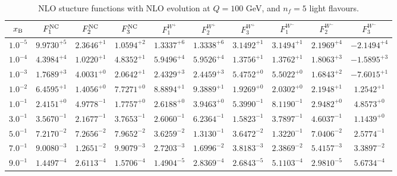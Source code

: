 \begin{table}[h]
\begin{adjustbox}{width=\textwidth}
\begin{tabular}{|c||c|c|c|c|c|c|c|c|c|}
\hline
$x_{\rm B}$ & $F_1^{\rm NC}$ & $F_2^{\rm NC}$ & $F_3^{\rm NC}$ & $F_1^{W^+}$ & $F_2^{W^+}$ & $F_3^{W^+}$ & $F_1^{W^-}$ & $F_2^{W^-}$ & $F_3^{W^-}$ \\
\hline
$ 1.0^{-5}$ & $ 9.9730^{+5}$ & $ 2.3646^{+1}$ & $ 1.0594^{+2}$ & $ 1.3337^{+6}$ & $ 1.3338^{+6}$ & $ 3.1492^{+1}$ & $ 3.1494^{+1}$ & $ 2.1969^{+4}$ & $-2.1494^{+4}$ \\
$ 1.0^{-4}$ & $ 4.3984^{+4}$ & $ 1.0220^{+1}$ & $ 4.8352^{+1}$ & $ 5.9496^{+4}$ & $ 5.9526^{+4}$ & $ 1.3756^{+1}$ & $ 1.3762^{+1}$ & $ 1.8063^{+3}$ & $-1.5895^{+3}$ \\
$ 1.0^{-3}$ & $ 1.7689^{+3}$ & $ 4.0031^{+0}$ & $ 2.0642^{+1}$ & $ 2.4329^{+3}$ & $ 2.4459^{+3}$ & $ 5.4752^{+0}$ & $ 5.5022^{+0}$ & $ 1.6843^{+2}$ & $-7.6015^{+1}$ \\
$ 1.0^{-2}$ & $ 6.4595^{+1}$ & $ 1.4056^{+0}$ & $ 7.7271^{+0}$ & $ 8.8894^{+1}$ & $ 9.3889^{+1}$ & $ 1.9269^{+0}$ & $ 2.0302^{+0}$ & $ 2.1948^{+1}$ & $ 1.2542^{+1}$ \\
$ 1.0^{-1}$ & $ 2.4151^{+0}$ & $ 4.9778^{-1}$ & $ 1.7757^{+0}$ & $ 2.6188^{+0}$ & $ 3.9463^{+0}$ & $ 5.3990^{-1}$ & $ 8.1190^{-1}$ & $ 2.9482^{+0}$ & $ 4.8573^{+0}$ \\
$ 3.0^{-1}$ & $ 3.5670^{-1}$ & $ 2.1677^{-1}$ & $ 3.7653^{-1}$ & $ 2.6060^{-1}$ & $ 6.2364^{-1}$ & $ 1.5823^{-1}$ & $ 3.7897^{-1}$ & $ 4.6037^{-1}$ & $ 1.1439^{+0}$ \\
$ 5.0^{-1}$ & $ 7.2170^{-2}$ & $ 7.2656^{-2}$ & $ 7.9652^{-2}$ & $ 3.6259^{-2}$ & $ 1.3130^{-1}$ & $ 3.6472^{-2}$ & $ 1.3220^{-1}$ & $ 7.0406^{-2}$ & $ 2.5774^{-1}$ \\
$ 7.0^{-1}$ & $ 9.0080^{-3}$ & $ 1.2651^{-2}$ & $ 9.9079^{-3}$ & $ 2.7203^{-3}$ & $ 1.6996^{-2}$ & $ 3.8183^{-3}$ & $ 2.3869^{-2}$ & $ 5.4157^{-3}$ & $ 3.3897^{-2}$ \\
$ 9.0^{-1}$ & $ 1.4497^{-4}$ & $ 2.6113^{-4}$ & $ 1.5706^{-4}$ & $ 1.4904^{-5}$ & $ 2.8369^{-4}$ & $ 2.6843^{-5}$ & $ 5.1103^{-4}$ & $ 2.9810^{-5}$ & $ 5.6734^{-4}$ \\
\hline
\end{tabular}
\end{adjustbox}\caption{NLO stucture functions with NLO evolution at $Q = 100$ GeV, and $n_f=5$ light flavours.}
\label{tab:N1LO-Q100}
\end{table}


